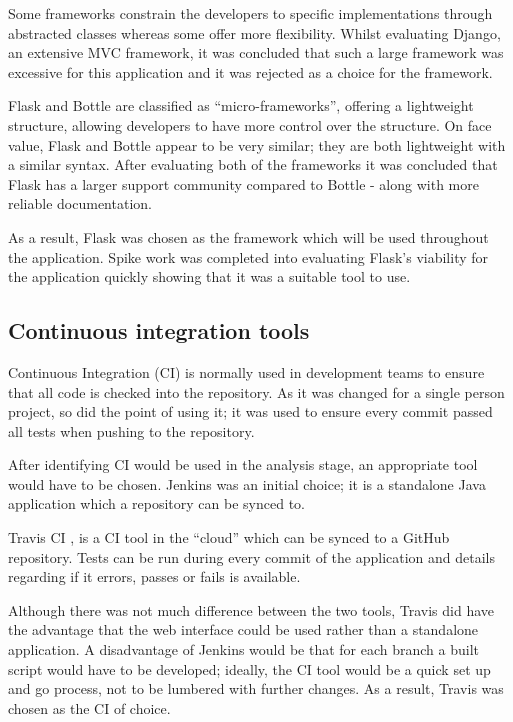 Some frameworks constrain the developers to specific implementations through abstracted classes whereas some offer more flexibility. Whilst evaluating Django, an extensive MVC framework, it was concluded that such a large framework was excessive for this application and it was rejected as a choice for the framework.

Flask and Bottle are classified as ``micro-frameworks'', offering a lightweight structure, allowing developers to have more control over the structure. On face value, Flask and Bottle appear to be very similar; they are both lightweight with a similar syntax. After evaluating both of the frameworks it was concluded that Flask has a larger support community compared to Bottle - along with more reliable documentation.

As a result, Flask was chosen as the framework which will be used throughout the application. Spike work was completed into evaluating Flask's viability for the application quickly showing that it was a suitable tool to use.

\subsection{Continuous integration tools}
Continuous Integration (CI) is normally used in development teams to ensure that all code is checked into the repository. As it was changed for a single person project, so did the point of using it; it was used to ensure every commit passed all tests when pushing to the repository.

After identifying CI would be used in the analysis stage, an appropriate tool would have to be chosen. Jenkins \cite{citeulike:14023837} was an initial choice; it is a standalone Java application which a repository can be synced to.

Travis CI \cite{citeulike:14023840}, is a CI tool in the ``cloud'' which can be synced to a GitHub repository. Tests can be run during every commit of the application and details regarding if it errors, passes or fails is available.

Although there was not much difference between the two tools, Travis did have the advantage that the web interface could be used rather than a standalone application. A disadvantage of Jenkins would be that for each branch a built script would have to be developed; ideally, the CI tool would be a quick set up and go process, not to be lumbered with further changes. As a result, Travis was chosen as the CI of choice.

